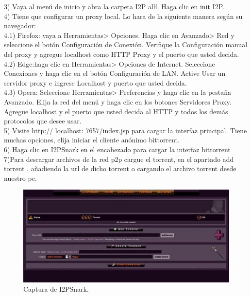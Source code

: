 \documentclass{article}
\begin{document}
3) Vaya al menú de inicio y abra la carpeta I2P allí. Haga clic en init I2P.
\\

4) Tiene que configurar un proxy local. Lo hara de la siguiente manera según su navegador:
\\

4.1) Firefox: vaya a Herramientas> Opciones. Haga clic en Avanzado> Red y seleccione el botón Configuración de Conexión. Verifique la Configuración manual del proxy y agregue localhost como HTTP Proxy y el puerto que usted decida.
\\

4.2) Edge:haga clic en Herramientas> Opciones de Internet. Seleccione Conexiones  y haga clic en el botón Configuración de LAN. Active Usar un servidor proxy e ingrese Localhost y puerto que usted decida.
\\

4.3) Opera: Seleccione Herramientas> Preferencias y haga clic en la pestaña Avanzado. Elija la red del menú y haga clic en los botones Servidores Proxy. Agregue localhost y el puerto que usted decida al HTTP y todos los demás protocolos que desee usar.
\\

5) Visite http:// localhost: 7657/index.jsp para cargar la interfaz principal. Tiene muchas opciones, elija iniciar el cliente anónimo bittorrent.
\\

6) Haga clic en I2PSnark en el encabezado para cargar la interfaz bittorrent
\\

7)Para descargar archivos de la red p2p  cargue el torrent, en el apartado add torrent , añadiendo la url de dicho torrent o cargando el archivo torrent desde nuestro pc.
\\

\begin{figure}
    \includegraphics[]{media/i2p_3.jpg}
    \caption{Captura de I2PSnark.}
    \label{fig4}
\end{figure}
\end{document}
